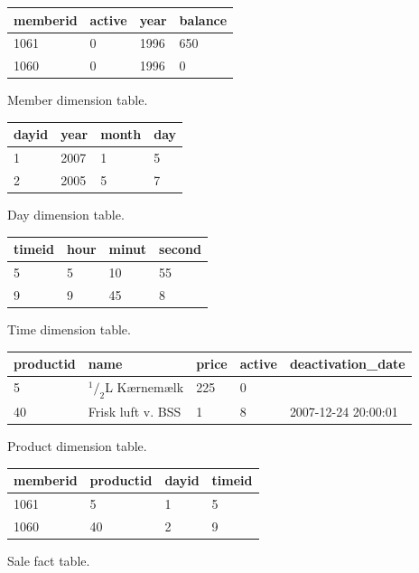 \begin{figure}[H]
    \begin{tabular}{|l|l|l|l|}
        \hline
        memberid        & active    & year & balance    \\ \hline
        1061            & 0         & 1996 & 650        \\ \hline
        1060            & 0         & 1996 & 0          \\ \hline
    \end{tabular}
    \caption{Member dimension table.}
    \label{fig:uml_eks2}

    \begin{tabular}{|l|l|l|l|}
        \hline
        dayid       & year      & month & day   \\ \hline
        1           & 2007      & 1     & 5     \\ \hline
        2           & 2005      & 5     & 7     \\ \hline
    \end{tabular}
    \caption{Day dimension table.}
    \label{fig:uml_eks2}

    \begin{tabular}{|l|l|l|l|}
        \hline
        timeid      & hour      & minut     & second    \\ \hline
        5           & 5         & 10        & 55        \\ \hline
        9           & 9         & 45        & 8         \\ \hline
    \end{tabular}
    \caption{Time dimension table.}
    \label{fig:uml_eks2}

    \begin{tabular}{|l|l|l|l|l|}
        \hline
        productid   & name              & price     & active    & deactivation\_date     \\ \hline
        5           & $^1/_2$L Kærnemælk      & 225       & 0         &                       \\ \hline
        40          & Frisk luft v. BSS & 1         & 8         & 2007-12-24 20:00:01    \\ \hline
    \end{tabular}
    \caption{Product dimension table.}
    \label{fig:uml_eks2}

    \begin{tabular}{|l|l|l|l|}
        \hline
        memberid    & productid     & dayid     & timeid    \\ \hline
        1061        & 5             & 1         & 5         \\ \hline
        1060        & 40            & 2         & 9         \\ \hline
    \end{tabular}
    \caption{Sale fact table.}
    \label{fig:uml_eks2}

\end{figure}